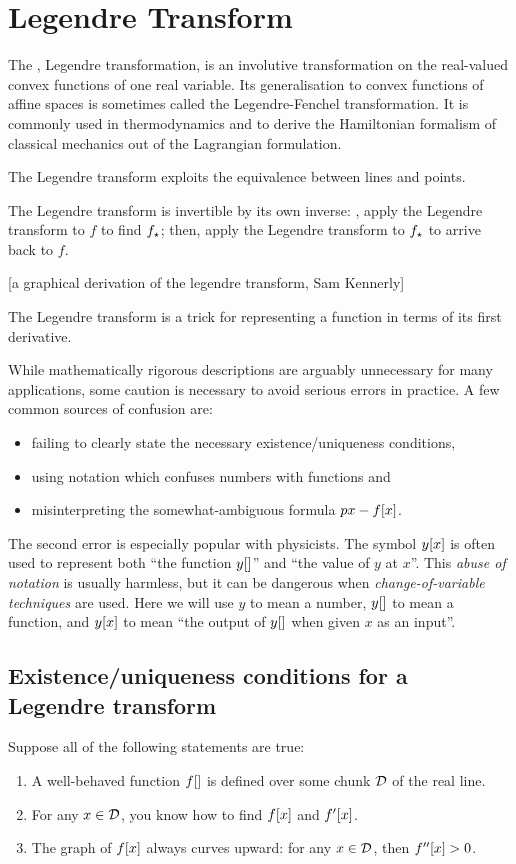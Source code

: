 \section{Legendre Transform}
The , \aka Legendre transformation, is an involutive transformation on the real-valued convex functions of one real variable. Its generalisation to convex functions of affine spaces is sometimes called the Legendre-Fenchel transformation. It is commonly used in thermodynamics and to derive the Hamiltonian formalism of classical mechanics out of the Lagrangian formulation.

The Legendre transform exploits the equivalence between lines and points.

The Legendre transform is invertible by its own inverse: \ie, apply the Legendre transform to $f$ to find ${f}_{\star}$; then, apply the Legendre transform to ${f}_{\star}$ to arrive back to $f$.

[a graphical derivation of the legendre transform, Sam Kennerly]

The Legendre transform is a trick for representing a function in terms of its first derivative.

While mathematically rigorous descriptions are arguably unnecessary for many applications, some caution is necessary to avoid serious errors in practice. A few common sources of confusion are:
\begin{itemize}
\item failing to clearly state the necessary existence/uniqueness conditions, 
\item using notation which confuses numbers with functions and
\item misinterpreting the somewhat-ambiguous formula $px - f\!\left[{x}\right]$.
\end{itemize}

The second error is especially popular with physicists. The symbol $y\!\left[{x}\right]$ is often used to represent both ``the function $y\!\left[{}\right]$'' and ``the value of $y$ at $x$''. This \emph{abuse of notation} is usually harmless, but it can be dangerous when \emph{change-of-variable techniques} are used. Here we will use $y$ to mean a number, $y\!\left[{}\right]$ to mean a function, and $y\!\left[{x}\right]$ to mean ``the output of $y\!\left[{}\right]$ when given $x$ as an input''.


\subsection{Existence/uniqueness conditions for a Legendre transform}
Suppose all of the following statements are true:
\begin{enumerate}
\item A well-behaved function $f\!\left[{}\right]$ is defined over some chunk $\mathcal{D}$ of the real line.
\item For any $x\in\mathcal{D}$, you know how to find $f\!\left[{x}\right]$ and $f'\!\left[{x}\right]$.
\item The graph of $f\!\left[{x}\right]$ always curves upward: for any $x\in\mathcal{D}$, then $f''\!\left[{x}\right] > 0$.
\end{enumerate}

